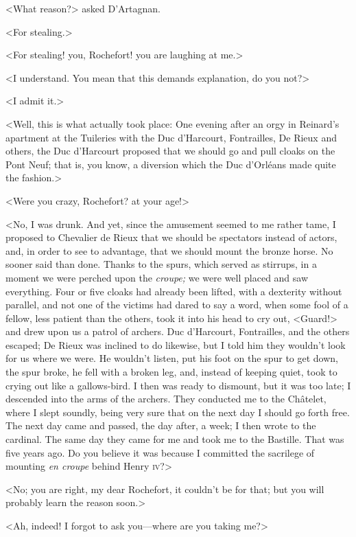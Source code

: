 <What reason?> asked D'Artagnan.

<For stealing.>

<For stealing! you, Rochefort! you are laughing at me.>

<I understand. You mean that this demands explanation, do you not?>

<I admit it.>

<Well, this is what actually took place: One evening after an orgy in Reinard's apartment at the Tuileries with the Duc d'Harcourt, Fontrailles, De Rieux and others, the Duc d'Harcourt proposed that we should go and pull cloaks on the Pont Neuf; that is, you know, a diversion which the Duc d'Orléans made quite the fashion.>

<Were you crazy, Rochefort? at your age!>

<No, I was drunk. And yet, since the amusement seemed to me rather tame, I proposed to Chevalier de Rieux that we should be spectators instead of actors, and, in order to see to advantage, that we should mount the bronze horse. No sooner said than done. Thanks to the spurs, which served as stirrups, in a moment we were perched upon the \textit{croupe;} we were well placed and saw everything. Four or five cloaks had already been lifted, with a dexterity without parallel, and not one of the victims had dared to say a word, when some fool of a fellow, less patient than the others, took it into his head to cry out, <Guard!> and drew upon us a patrol of archers. Duc d'Harcourt, Fontrailles, and the others escaped; De Rieux was inclined to do likewise, but I told him they wouldn't look for us where we were. He wouldn't listen, put his foot on the spur to get down, the spur broke, he fell with a broken leg, and, instead of keeping quiet, took to crying out like a gallows-bird. I then was ready to dismount, but it was too late; I descended into the arms of the archers. They conducted me to the Châtelet, where I slept soundly, being very sure that on the next day I should go forth free. The next day came and passed, the day after, a week; I then wrote to the cardinal. The same day they came for me and took me to the Bastille. That was five years ago. Do you believe it was because I committed the sacrilege of mounting \textit{en croupe} behind Henry \textsc{iv}?>

<No; you are right, my dear Rochefort, it couldn't be for that; but you will probably learn the reason soon.>

<Ah, indeed! I forgot to ask you—where are you taking me?>

